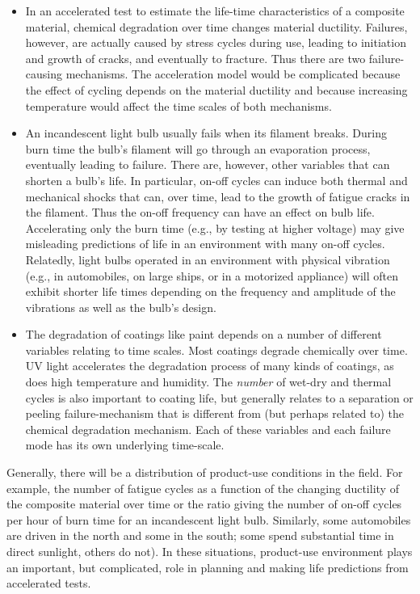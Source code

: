 \begin{itemize}
\item
In an accelerated test to estimate the life-time characteristics of
a composite material, chemical degradation over time changes
material ductility.  Failures, however, are actually caused by
stress cycles during use, leading to initiation and growth of
cracks, and eventually to fracture. Thus there are two
failure-causing mechanisms. The acceleration model would be
complicated because the effect of cycling depends on the
material ductility and because increasing temperature would affect
the time scales of both mechanisms.
\item
An incandescent light bulb usually fails when its filament
breaks. During burn time the bulb's filament will go through an
evaporation process, eventually leading to failure.  There are,
however, other variables that can shorten a bulb's life. In
particular, on-off cycles can induce both thermal and mechanical
shocks that can, over time, lead to the growth of fatigue cracks in
the filament.  Thus the on-off frequency can have an effect on bulb
life.  Accelerating only the burn time (e.g., by testing at higher
voltage) may give misleading predictions of life in an environment
with many on-off cycles. Relatedly, light bulbs operated in an
environment with physical vibration (e.g., in automobiles, on large
ships, or in a motorized appliance) will often exhibit shorter life
times depending on the frequency and amplitude of the vibrations as
well as the bulb's design.

\item
The degradation of coatings like paint depends on a number of
different variables relating to time scales.  Most coatings degrade
chemically over time.  UV light accelerates the degradation process
of many kinds of coatings, as does high temperature and humidity.
The {\em number} of wet-dry and thermal cycles is also important to
coating life, but generally relates to a separation or peeling
failure-mechanism that is different from (but perhaps related to)
the chemical degradation mechanism. Each of these variables and each
failure mode has its own underlying time-scale.
\end{itemize}

Generally, there will be a distribution of product-use conditions
in the field.  For example, the number of fatigue cycles as a
function of the changing ductility of the composite material over
time or the ratio giving the number of on-off cycles per hour of
burn time for an incandescent light bulb. Similarly, some
automobiles are driven in the north and some in the south; some
spend substantial time in direct sunlight, others do not).  In these
situations, product-use environment plays an important, but
complicated, role in planning and making life predictions from
accelerated tests.

